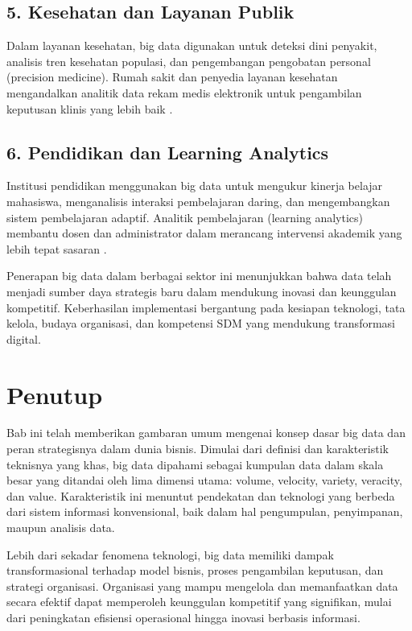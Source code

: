\subsection*{5. Kesehatan dan Layanan Publik}

Dalam layanan kesehatan, big data digunakan untuk deteksi dini penyakit, analisis tren kesehatan populasi, dan pengembangan pengobatan personal (precision medicine). Rumah sakit dan penyedia layanan kesehatan mengandalkan analitik data rekam medis elektronik untuk pengambilan keputusan klinis yang lebih baik \cite{ristevski2018}.

\subsection*{6. Pendidikan dan Learning Analytics}

Institusi pendidikan menggunakan big data untuk mengukur kinerja belajar mahasiswa, menganalisis interaksi pembelajaran daring, dan mengembangkan sistem pembelajaran adaptif. Analitik pembelajaran (learning analytics) membantu dosen dan administrator dalam merancang intervensi akademik yang lebih tepat sasaran \cite{papamitsiou2014}.

Penerapan big data dalam berbagai sektor ini menunjukkan bahwa data telah menjadi sumber daya strategis baru dalam mendukung inovasi dan keunggulan kompetitif. Keberhasilan implementasi bergantung pada kesiapan teknologi, tata kelola, budaya organisasi, dan kompetensi SDM yang mendukung transformasi digital.

\section{Penutup}

Bab ini telah memberikan gambaran umum mengenai konsep dasar big data dan peran strategisnya dalam dunia bisnis. Dimulai dari definisi dan karakteristik teknisnya yang khas, big data dipahami sebagai kumpulan data dalam skala besar yang ditandai oleh lima dimensi utama: volume, velocity, variety, veracity, dan value. Karakteristik ini menuntut pendekatan dan teknologi yang berbeda dari sistem informasi konvensional, baik dalam hal pengumpulan, penyimpanan, maupun analisis data.

Lebih dari sekadar fenomena teknologi, big data memiliki dampak transformasional terhadap model bisnis, proses pengambilan keputusan, dan strategi organisasi. Organisasi yang mampu mengelola dan memanfaatkan data secara efektif dapat memperoleh keunggulan kompetitif yang signifikan, mulai dari peningkatan efisiensi operasional hingga inovasi berbasis informasi.

